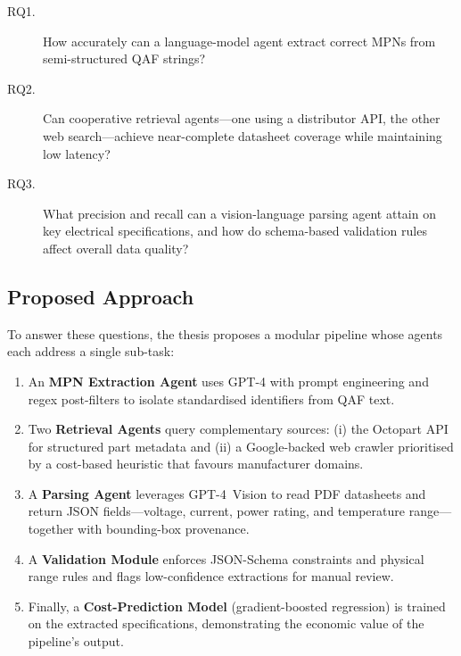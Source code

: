 \begin{description}
  \item[RQ1.] How accurately can a language-model agent extract correct MPNs from semi-structured QAF strings?
  \item[RQ2.] Can cooperative retrieval agents—one using a distributor API, the other web search—achieve near-complete datasheet coverage while maintaining low latency?
  \item[RQ3.] What precision and recall can a vision-language parsing agent attain on key electrical specifications, and how do schema-based validation rules affect overall data quality?
\end{description}

\subsection{Proposed Approach}
To answer these questions, the thesis proposes a modular pipeline whose agents each address a single sub-task:  
\begin{enumerate}
  \item An \textbf{MPN Extraction Agent} uses GPT-4 with prompt engineering and regex post-filters to isolate standardised identifiers from QAF text.  
  \item Two \textbf{Retrieval Agents} query complementary sources: (i) the Octopart API for structured part metadata and (ii) a Google-backed web crawler prioritised by a cost-based heuristic that favours manufacturer domains.  
  \item A \textbf{Parsing Agent} leverages GPT-4~Vision to read PDF datasheets and return JSON fields—voltage, current, power rating, and temperature range—together with bounding-box provenance.  
  \item A \textbf{Validation Module} enforces JSON-Schema constraints and physical range rules and flags low-confidence extractions for manual review.  
  \item Finally, a \textbf{Cost-Prediction Model} (gradient-boosted regression) is trained on the extracted specifications, demonstrating the economic value of the pipeline’s output.
\end{enumerate}

